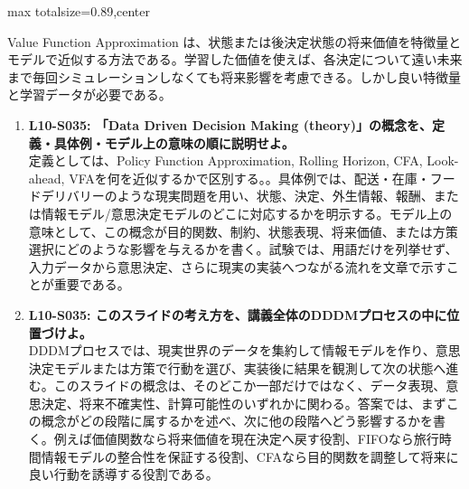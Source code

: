 \begin{minipage}[t]{0.58\textwidth}
\begin{adjustbox}{max totalsize={\textwidth}{0.89\textheight},center}
\begin{minipage}{\textwidth}
Value Function Approximation は、状態または後決定状態の将来価値を特徴量とモデルで近似する方法である。学習した価値を使えば、各決定について遠い未来まで毎回シミュレーションしなくても将来影響を考慮できる。しかし良い特徴量と学習データが必要である。\par{}\begin{enumerate}\item \textbf{L10-S035: 「Data Driven Decision Making (theory)」の概念を、定義・具体例・モデル上の意味の順に説明せよ。}\\定義としては、Policy Function Approximation, Rolling Horizon, CFA, Look-ahead, VFAを何を近似するかで区別する。。具体例では、配送・在庫・フードデリバリーのような現実問題を用い、状態、決定、外生情報、報酬、または情報モデル/意思決定モデルのどこに対応するかを明示する。モデル上の意味として、この概念が目的関数、制約、状態表現、将来価値、または方策選択にどのような影響を与えるかを書く。試験では、用語だけを列挙せず、入力データから意思決定、さらに現実の実装へつながる流れを文章で示すことが重要である。\item \textbf{L10-S035: このスライドの考え方を、講義全体のDDDMプロセスの中に位置づけよ。}\\DDDMプロセスでは、現実世界のデータを集約して情報モデルを作り、意思決定モデルまたは方策で行動を選び、実装後に結果を観測して次の状態へ進む。このスライドの概念は、そのどこか一部だけではなく、データ表現、意思決定、将来不確実性、計算可能性のいずれかに関わる。答案では、まずこの概念がどの段階に属するかを述べ、次に他の段階へどう影響するかを書く。例えば価値関数なら将来価値を現在決定へ戻す役割、FIFOなら旅行時間情報モデルの整合性を保証する役割、CFAなら目的関数を調整して将来に良い行動を誘導する役割である。\end{enumerate}
\end{minipage}
\end{adjustbox}
\end{minipage}


